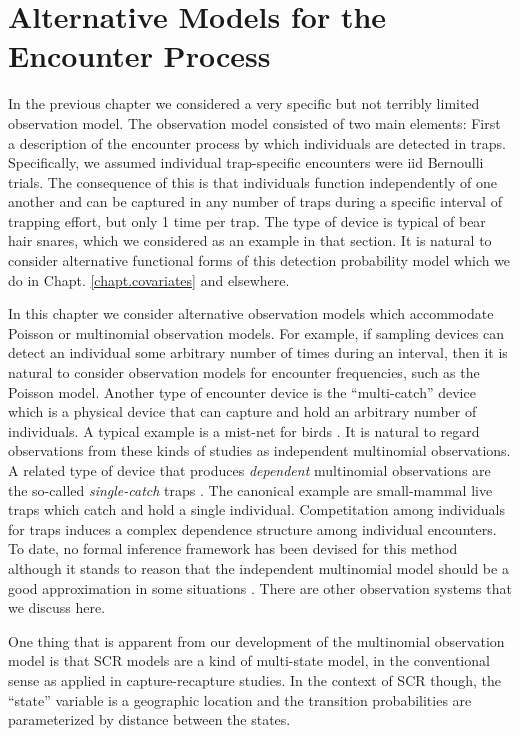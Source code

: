 \chapter{Alternative Models for the Encounter Process}
\label{chapt.poisson-mn}

In the previous chapter we considered a very specific but not
terribly limited observation model. The observation model consisted of
two main elements: First a description of the encounter process
by which individuals are detected in traps. Specifically, we
assumed individual trap-specific encounters were iid Bernoulli
trials. The consequence of this is that individuals function
independently of one another and can be captured in
any number of traps during a specific interval of trapping
effort, but only 1 time per trap. 
The type of device is typical of bear hair snares, which we
considered as an example in that section. 
 It is natural to consider
alternative functional forms of this detection probability model which
we do in Chapt. \ref{chapt.covariates} and elsewhere.

In this chapter we consider alternative observation models which
accommodate Poisson or multinomial observation models. For example, if
sampling devices can detect an individual some arbitrary number of
times during an interval, then it is natural to consider observation
models for encounter frequencies, such as the Poisson model. Another
type of encounter device is the ``multi-catch'' device
\citep{efford_etal:2009euring} which
is a physical device that can capture and hold an arbitrary number of
individuals. A typical example is a mist-net for birds
\citep{borchers_efford:2008}.  It is natural to regard observations
from these kinds of studies as independent multinomial observations.
A related type of device that produces {\it dependent} multinomial
observations are the so-called {\it single-catch} traps
\citep{efford_etal:2009euring}. The canonical example are small-mammal
live traps which catch and hold a single individual. Competitation
among individuals for traps induces a complex dependence structure
among individual encounters. To date, no formal inference framework
has been devised for this method although it stands to reason that the
independent multinomial model should be a good approximation in some
situations \citep{efford_etal:2009euring}.  There are other
observation systems that we discuss here.

One thing that is apparent from our development of the multinomial
observation model is that SCR models are a kind of multi-state model,
in the conventional sense as applied in capture-recapture studies. In
the context of SCR though, the ``state'' variable is a geographic
location and the transition probabilities are parameterized by
distance between the states.





